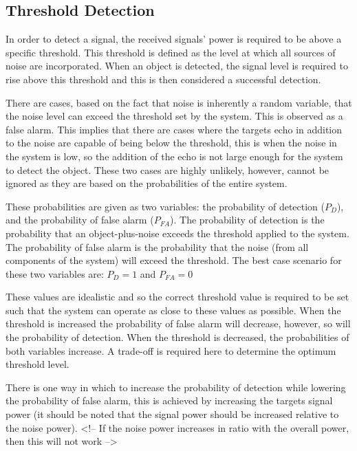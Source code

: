 \documentclass[11pt]{witseiepaper}
\begin{document}
\subsection{Threshold Detection} \label{sec:ThresholdDetection}

In order to detect a signal, the received signals' power is required to be above a specific threshold. This threshold is defined as the level at which all sources of noise are incorporated. When an object is detected, the signal level is required to rise above this threshold and this is then considered a successful detection.

There are cases, based on the fact that noise is inherently a random variable, that the noise level can exceed the threshold set by the system. This is observed as a false alarm.
This implies that there are cases where the targets echo in addition to the noise are capable of being below the threshold, this is when the noise in the system is low, so the addition of the echo is not large enough for the system to detect the object.
These two cases are highly unlikely, however, cannot be ignored as they are based on the probabilities of the entire system.

These probabilities are given as two variables: the probability of detection ($P_{D}$), and the probability of false alarm ($P_{FA}$). The probability of detection is the probability that an object-plus-noise exceeds the threshold applied to the system. The probability of false alarm is the probability that the noise (from all components of the system) will exceed the threshold.
The best case scenario for these two variables are: 
$P_{D} = 1$
and
$P_{FA} = 0$

These values are idealistic and so the correct threshold value is required to be set such that the system can operate as close to these values as possible.
When the threshold is increased the probability of false alarm will decrease, however, so will the probability of detection. When the threshold is decreased, the probabilities of both variables increase. A trade-off is required here to determine the optimum threshold level.

There is one way in which to increase the probability of detection while lowering the probability of false alarm, this is achieved by increasing the targets signal power (it should be noted that the signal power should be increased relative to the noise power). 
<!-- If the noise power increases in ratio with the overall power, then this will not work -->
\end{document}
